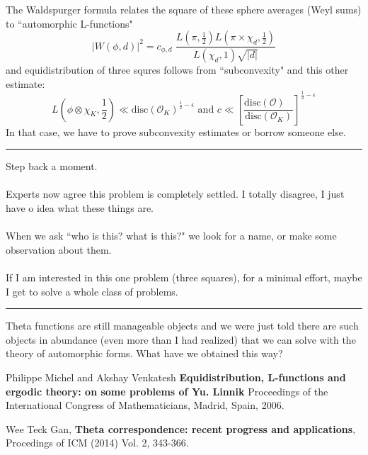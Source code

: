 \documentclass[12pt]{article}
\begin{document}
\newpage

\noindent The Waldspurger formula relates the square of these sphere averages (Weyl sums) to ``automorphic L-functions"
$$ \big|W(\phi, d)\big|^2 = c_{\phi, d} \; \frac{L(\pi, \frac{1}{2}) L(\pi \times \chi_d , \frac{1}{2})}{L(\chi_d, 1)\sqrt{|d|}} $$
and equidistribution of three squres follows from ``subconvexity" and this other estimate:
$$ L(\phi \otimes \chi_K, \frac{1}{2})  \ll \mathrm{disc}(\mathcal{O}_K)^{\frac{1}{2} - \epsilon} \text{ and } c \ll \left[\frac{\mathrm{disc}(\mathcal{O})\;\;\;}{\mathrm{disc}(\mathcal{O}_K)}\right]^{\frac{1}{2} - \epsilon} $$
In that case, we have to prove subconvexity estimates or borrow someone else.
\vspace{6pt}
\hrule
\vspace{6pt}
\noindent Step back a moment.  \\ \\
Experts now agree this problem is completely settled.  I totally disagree, I just have o idea what these things are.   \\ \\
When we ask ``who is this?  what is this?" we look for a name, or make some observation about them.  \\ \\
If I am interested in this one problem (three squares), for a minimal effort, maybe I get to solve a whole class of problems. 
\vspace{6pt}
\hrule
\vspace{6pt}
\noindent Theta functions are still manageable objects and we were just told there are such objects in abundance (even more than I had realized) that we can solve with the theory of automorphic forms.  What have we obtained this way?

\vfill


\selectfont \fontsize{12}{10}\selectfont

\begin{thebibliography}{}

\item Philippe Michel and Akshay Venkatesh \textbf{Equidistribution, L-functions and ergodic theory: on some problems of Yu. Linnik} Proceedings of the International Congress
of Mathematicians, Madrid, Spain, 2006.

\item  Wee Teck Gan, \textbf{Theta correspondence: recent progress and applications}, Procedings of
ICM (2014) Vol. 2, 343-366.

\end{thebibliography}
\end{document}
